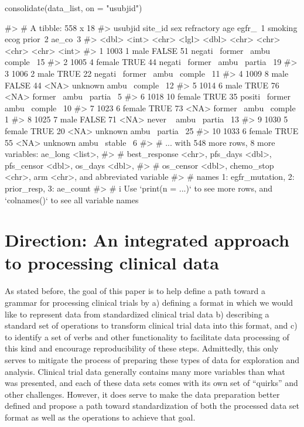\begin{Schunk}
\begin{Sinput}
consolidate(data_list, on = "usubjid")
\end{Sinput}
\begin{Soutput}
#> # A tibble: 558 x 18
#>    usubjid site_id sex    refractory   age egfr_~1 smoking ecog  prior~2 ae_co~3
#>      <dbl>   <int> <chr>  <lgl>      <dbl> <chr>   <chr>   <chr> <chr>     <int>
#>  1    1003       1 male   FALSE         51 negati~ former~ ambu~ comple~      15
#>  2    1005       4 female TRUE          44 negati~ former~ ambu~ partia~      19
#>  3    1006       2 male   TRUE          22 negati~ former~ ambu~ comple~      11
#>  4    1009       8 male   FALSE         44 <NA>    unknown ambu~ comple~      12
#>  5    1014       6 male   TRUE          76 <NA>    former~ ambu~ partia~       5
#>  6    1018      10 female TRUE          35 positi~ former~ ambu~ comple~      10
#>  7    1023       6 female TRUE          73 <NA>    former~ ambu~ comple~       1
#>  8    1025       7 male   FALSE         71 <NA>    never ~ ambu~ partia~      13
#>  9    1030       5 female TRUE          20 <NA>    unknown ambu~ partia~      25
#> 10    1033       6 female TRUE          55 <NA>    unknown ambu~ stable~       6
#> # ... with 548 more rows, 8 more variables: ae_long <list>,
#> #   best_response <chr>, pfs_days <dbl>, pfs_censor <dbl>, os_days <dbl>,
#> #   os_censor <dbl>, chemo_stop <chr>, arm <chr>, and abbreviated variable
#> #   names 1: egfr_mutation, 2: prior_resp, 3: ae_count
#> # i Use `print(n = ...)` to see more rows, and `colnames()` to see all variable names
\end{Soutput}
\end{Schunk}

\hypertarget{direction-an-integrated-approach-to-processing-clinical-data}{%
\section{Direction: An integrated approach to processing clinical
data}\label{direction-an-integrated-approach-to-processing-clinical-data}}

As stated before, the goal of this paper is to help define a path toward
a grammar for processing clinical trials by a) defining a format in
which we would like to represent data from standardized clinical trial
data b) describing a standard set of operations to transform clinical
trial data into this format, and c) to identify a set of verbs and other
functionality to facilitate data processing of this kind and encourage
reproducibility of these steps. Admittedly, this only serves to mitigate
the process of preparing these types of data for exploration and
analysis. Clinical trial data generally contains many more variables
than what was presented, and each of these data sets comes with its own
set of ``quirks'' and other challenges. However, it does serve to make
the data preparation better defined and propose a path toward
standardization of both the processed data set format as well as the
operations to achieve that goal.

